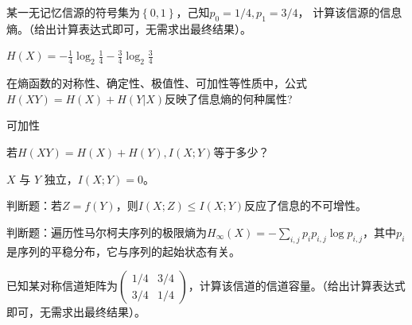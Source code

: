 \begin{problem}
	某一无记忆信源的符号集为$\left\{0,1\right\}$，己知$p_0= 1/4,p_1=3/4$， 计算该信源的信息熵。（给出计算表达式即可，无需求出最终结果）。
\end{problem}
\begin{solution}
	$H(X) = -\frac{1}{4}\log_2 \frac{1}{4} - \frac{3}{4}\log_2 \frac{3}{4}$
\end{solution}



\begin{problem}
	在熵函数的对称性、确定性、极值性、可加性等性质中，公式$H(XY)=H(X)+H(Y|X)$反映了信息熵的何种属性?
\end{problem}
\begin{solution}
	可加性
\end{solution}



\begin{problem}
	若$H(XY)=H(X)+H(Y),I(X;Y)$等于多少？
\end{problem}
\begin{solution}
	$X$ 与 $Y$ 独立，$I(X; Y) = 0$。
\end{solution}



\begin{problem}
	判断题：若$Z=f(Y)$，则$I(X;Z)\le I(X;Y)$反应了信息的不可增性。
\end{problem}
\begin{solution}
	
\end{solution}



\begin{problem}
	判断题：遍历性马尔柯夫序列的极限熵为$H_\infty(X)=-\sum_{i,j}p_ip_{i,j}\log p_{i,j}$，其中$p_i$是序列的平稳分布，它与序列的起始状态有关。
\end{problem}
\begin{solution}
	
\end{solution}



\begin{problem}
	已知某对称信道矩阵为$\begin{pmatrix}1/4&3/4\\3/4&1/4\end{pmatrix}$，计算该信道的信道容量。（给出计算表达式即可，无需求出最终结果）。
\end{problem}
\begin{solution}
	
\end{solution}



